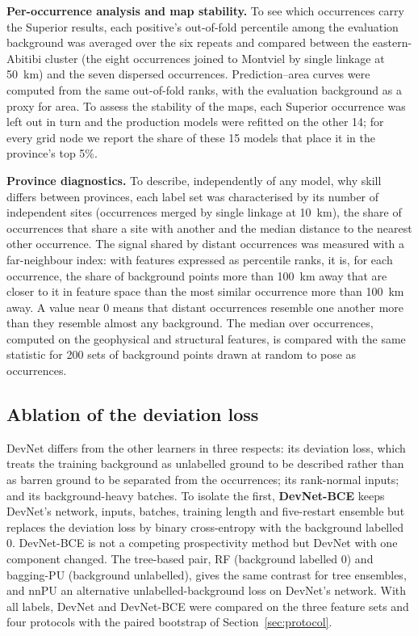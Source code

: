 \documentclass[pdflatex,sn-apa]{sn-jnl}
\begin{document}
\textbf{Per-occurrence analysis and map stability.} To see which occurrences carry the Superior results, each positive's out-of-fold percentile among the evaluation background was averaged over the six repeats and compared between the eastern-Abitibi cluster (the eight occurrences joined to Montviel by single linkage at 50~km) and the seven dispersed occurrences. Prediction--area curves \citep{YousefiCarranza2015} were computed from the same out-of-fold ranks, with the evaluation background as a proxy for area. To assess the stability of the maps, each Superior occurrence was left out in turn and the production models were refitted on the other 14; for every grid node we report the share of these 15 models that place it in the province's top 5\%.

\textbf{Province diagnostics.} To describe, independently of any model, why skill differs between provinces, each label set was characterised by its number of independent sites (occurrences merged by single linkage at 10~km), the share of occurrences that share a site with another and the median distance to the nearest other occurrence. The signal shared by distant occurrences was measured with a far-neighbour index: with features expressed as percentile ranks, it is, for each occurrence, the share of background points more than 100~km away that are closer to it in feature space than the most similar occurrence more than 100~km away. A value near 0 means that distant occurrences resemble one another more than they resemble almost any background. The median over occurrences, computed on the geophysical and structural features, is compared with the same statistic for 200 sets of background points drawn at random to pose as occurrences.

\subsection{Ablation of the deviation loss}\label{sec:ablation-methods}

DevNet differs from the other learners in three respects: its deviation loss, which treats the training background as unlabelled ground to be described rather than as barren ground to be separated from the occurrences; its rank-normal inputs; and its background-heavy batches. To isolate the first, \textbf{DevNet-BCE} keeps DevNet's network, inputs, batches, training length and five-restart ensemble but replaces the deviation loss by binary cross-entropy with the background labelled 0. DevNet-BCE is not a competing prospectivity method but DevNet with one component changed. The tree-based pair, RF (background labelled 0) and bagging-PU (background unlabelled), gives the same contrast for tree ensembles, and nnPU an alternative unlabelled-background loss on DevNet's network. With all labels, DevNet and DevNet-BCE were compared on the three feature sets and four protocols with the paired bootstrap of Section~\ref{sec:protocol}.
\end{document}
